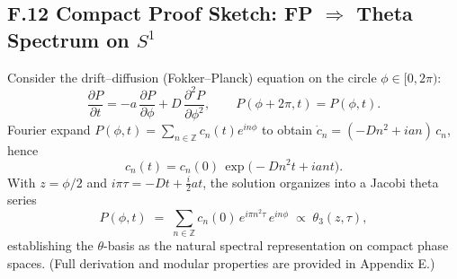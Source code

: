 \subsection*{F.12 Compact Proof Sketch: FP $\Rightarrow$ Theta Spectrum on $S^1$}
Consider the drift--diffusion (Fokker--Planck) equation on the circle $\phi\in[0,2\pi)$:
\begin{equation}
\frac{\partial P}{\partial t} = -a\,\frac{\partial P}{\partial \phi} + D\,\frac{\partial^2 P}{\partial \phi^2}, \qquad P(\phi+2\pi,t)=P(\phi,t).
\end{equation}
Fourier expand $P(\phi,t)=\sum_{n\in\mathbb{Z}} c_n(t) e^{i n \phi}$ to obtain $\dot{c}_n = (-D n^2 + i a n)\, c_n$, hence
\begin{equation}
c_n(t)=c_n(0)\,\exp\!\big(-D n^2 t + i a n t\big).
\end{equation}
With $z=\phi/2$ and $i\pi\tau=-Dt+\tfrac{i}{2} a t$, the solution organizes into a Jacobi theta series
\begin{equation}
P(\phi,t) \;=\; \sum_{n\in\mathbb{Z}} c_n(0)\, e^{i\pi n^2 \tau}\, e^{i n \phi} \;\propto\; \theta_3(z,\tau),
\end{equation}
establishing the $\theta$-basis as the natural spectral representation on compact phase spaces. (Full derivation and modular properties are provided in Appendix E.)

